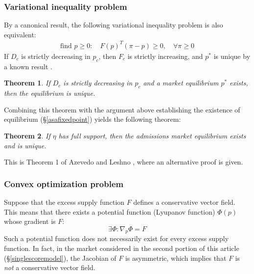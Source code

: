 \documentclass[12pt]{article}
\numberwithin{equation}{subsection}
\newtheorem{theorem}{Theorem}
\theoremstyle{definition}
\begin{document}
\subsubsection{Variational inequality problem}
By a canonical result, the following variational inequality problem is also equivalent:
\begin{align*}
\text{find } p \geq 0:\quad F(p)^T (\pi-p) \geq 0, \quad \forall \pi \geq 0
\end{align*}
If $D_c$ is strictly decreasing in $p_c$, then $F_c$ is strictly increasing, and $p^*$ is unique by a known result \parencite[][\S2]{theoryofvariationalinequalities}.
\begin{theorem} \label{demanddecreasingimpliesunique}
If $D_c$ is strictly decreasing in $p_c$ and a market equilibrium $p^*$ exists, then the equilibrium is unique.
\end{theorem}

Combining this theorem with the argument above establishing the existence of equilibrium (\S\ref{asafixedpoint}) yields the following theorem:
\begin{theorem} \label{fullsupportimpliesunique}
If $\eta$ has full support, then the admissions market equilibrium exists and is unique.
\end{theorem}
This is Theorem 1 of Azevedo and Leshno \parencite*{supplydemandfw}, where an alternative proof is given.

\subsubsection{Convex optimization problem}
Suppose that the excess supply function $F$ defines a conservative vector field. This means that there exists a potential function (Lyupanov function) $\Phi(p)$ whose gradient is $F$:
\[\exists \Phi: \nabla_p \Phi = F\]
Such a potential function does not necessarily exist for every excess supply function. In fact, in the market considered in the second portion of this article (\S\ref{singlescoremodel}), the Jacobian of $F$ is asymmetric, which implies that $F$ is \emph{not} a conservative vector field. 
\end{document}

